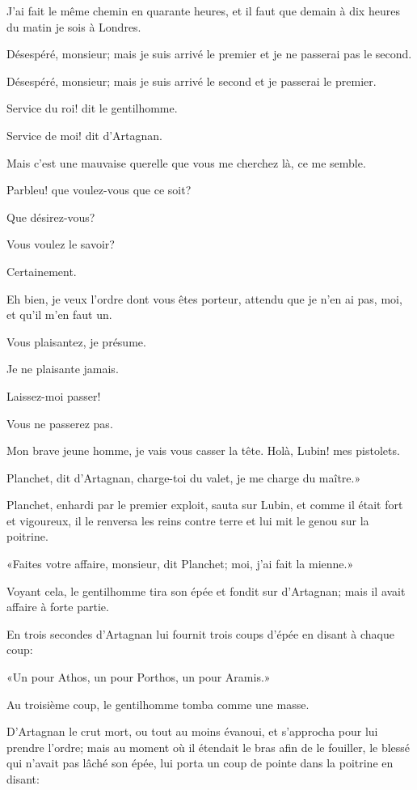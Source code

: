 \speak  J'ai fait le même chemin en quarante heures, et il faut que demain à dix heures du matin je sois à Londres. 

\speak  Désespéré, monsieur; mais je suis arrivé le premier et je ne passerai pas le second. 

\speak  Désespéré, monsieur; mais je suis arrivé le second et je passerai le premier. 

\speak  Service du roi! dit le gentilhomme. 

\speak  Service de moi! dit d'Artagnan. 

\speak  Mais c'est une mauvaise querelle que vous me cherchez là, ce me semble. 

\speak  Parbleu! que voulez-vous que ce soit? 

\speak  Que désirez-vous? 

\speak  Vous voulez le savoir? 

\speak  Certainement. 

\speak  Eh bien, je veux l'ordre dont vous êtes porteur, attendu que je n'en ai pas, moi, et qu'il m'en faut un. 

\speak  Vous plaisantez, je présume. 

\speak  Je ne plaisante jamais. 

\speak  Laissez-moi passer! 

\speak  Vous ne passerez pas. 

\speak  Mon brave jeune homme, je vais vous casser la tête. Holà, Lubin! mes pistolets. 

\speak  Planchet, dit d'Artagnan, charge-toi du valet, je me charge du maître.» 

Planchet, enhardi par le premier exploit, sauta sur Lubin, et comme il était fort et vigoureux, il le renversa les reins contre terre et lui mit le genou sur la poitrine. 

«Faites votre affaire, monsieur, dit Planchet; moi, j'ai fait la mienne.» 

Voyant cela, le gentilhomme tira son épée et fondit sur d'Artagnan; mais il avait affaire à forte partie. 

En trois secondes d'Artagnan lui fournit trois coups d'épée en disant à chaque coup: 

«Un pour Athos, un pour Porthos, un pour Aramis.» 

Au troisième coup, le gentilhomme tomba comme une masse. 

D'Artagnan le crut mort, ou tout au moins évanoui, et s'approcha pour lui prendre l'ordre; mais au moment où il étendait le bras afin de le fouiller, le blessé qui n'avait pas lâché son épée, lui porta un coup de pointe dans la poitrine en disant: 

